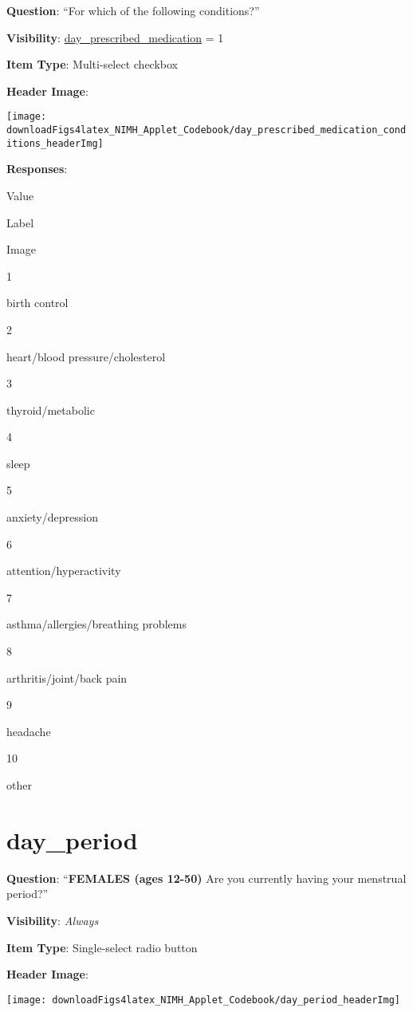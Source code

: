 \documentclass[]{book}
\begin{document}
\textbf{Question}: ``For which of the following conditions?''

\textbf{Visibility}: \protect\hyperlink{day_prescribed_medication}{day\_prescribed\_medication} = 1

\textbf{Item Type}: Multi-select checkbox

\textbf{Header Image}:

\begin{flushleft}\texttt{[image: downloadFigs4latex\_NIMH\_Applet\_Codebook/day\_prescribed\_medication\_conditions\_headerImg]} \end{flushleft}

\textbf{Responses}:

Value

Label

Image

1

birth control

2

heart/blood pressure/cholesterol

3

thyroid/metabolic

4

sleep

5

anxiety/depression

6

attention/hyperactivity

7

asthma/allergies/breathing problems

8

arthritis/joint/back pain

9

headache

10

other

\hypertarget{day_period}{%
\section{day\_period}\label{day_period}}

\textbf{Question}: ``\textbf{FEMALES (ages 12-50)} Are you currently having your menstrual period?''

\textbf{Visibility}: \emph{Always}

\textbf{Item Type}: Single-select radio button

\textbf{Header Image}:

\begin{flushleft}\texttt{[image: downloadFigs4latex\_NIMH\_Applet\_Codebook/day\_period\_headerImg]} \end{flushleft}
\end{document}
